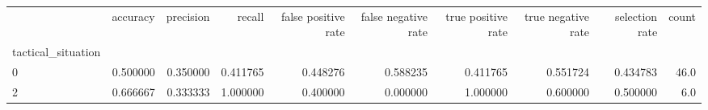 \begin{tabular}{lrrrrrrrrr}
\toprule
{} &  accuracy &  precision &    recall &  false positive rate &  false negative rate &  true positive rate &  true negative rate &  selection rate &  count \\
tactical\_situation &           &            &           &                      &                      &                     &                     &                 &        \\
\midrule
0                  &  0.500000 &   0.350000 &  0.411765 &             0.448276 &             0.588235 &            0.411765 &            0.551724 &        0.434783 &   46.0 \\
2                  &  0.666667 &   0.333333 &  1.000000 &             0.400000 &             0.000000 &            1.000000 &            0.600000 &        0.500000 &    6.0 \\
\bottomrule
\end{tabular}
